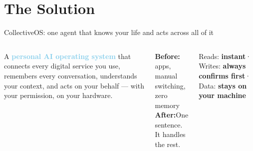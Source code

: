\documentclass[aspectratio=169, 10pt]{beamer}
\newcommand{\hl}[1]{\textcolor{skyblue}{\textbf{#1}}}
\begin{document}
\section{The Solution}

\begin{frame}{CollectiveOS: one agent that knows your life and acts across all of it}
  \begin{columns}[T]
      \begin{tcolorbox}[greencard, title={\faCheckCircle\; In One Sentence}]
        \normalsize
        A \hl{personal AI operating system} that connects every digital service you use, remembers every conversation, understands your context, and acts on your behalf — with your permission, on your hardware.
      \end{tcolorbox}
      \vspace{5pt}
      \begin{tcolorbox}[skycard, title={\faExchangeAlt\; Before vs.\ After}]
        \small
        \textbf{Before:} apps, manual switching, zero memory\\[4pt]
        \textbf{After:}\enspace One sentence. It handles the rest.
      \end{tcolorbox}

      \centering\vspace{0.3em}

      \vspace{6pt}
      \begin{tcolorbox}[ambercard, title={\faShieldAlt\; Safety by Architecture}]
        \small
        Reads: \textbf{instant}\enspace·\enspace
        Writes: \textbf{always confirms first}\enspace·\enspace
        Data: \textbf{stays on your machine}
      \end{tcolorbox}
  \end{columns}
\end{frame}
\end{document}
